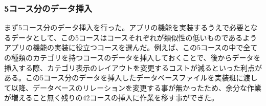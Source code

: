 ﻿\subsubsection{5コース分のデータ挿入}
まず5コース分のデータ挿入を行った。アプリの機能を実装するうえで必要となるデータとして、この5コースはコースそれぞれが類似性の低いものであるようアプリの機能の実装に役立つコースを選んだ。例えば、この5コースの中で全ての種類のカテゴリを持つコースのデータを挿入しておくことで、後からデータを挿入する際、カテゴリ表示のレイアウトを変更するコストが減るといった利点がある。この5コース分のデータを挿入したデータベースファイルを実装班に渡して以降、データベースのリレーションを変更する事が無かったため、余分な作業が増えること無く残りの42コースの挿入に作業を移す事ができた。
